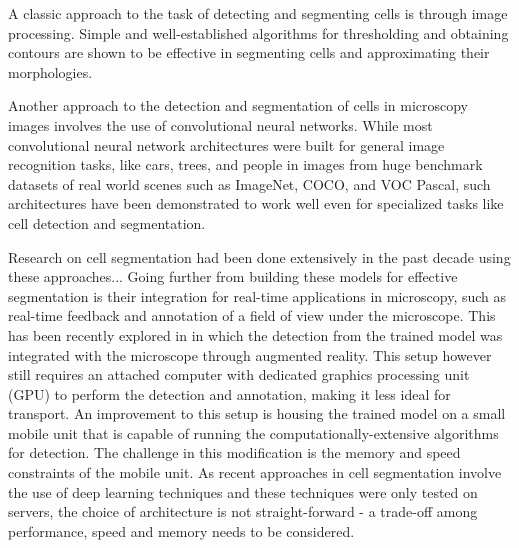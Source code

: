 \documentclass[10pt, journal, compsoc]{IEEEtran}
\begin{document}
A classic approach to the task of detecting and segmenting cells is through image processing. Simple and well-established algorithms for thresholding and obtaining contours are shown to be effective in segmenting cells and approximating their morphologies. 

Another approach to the detection and segmentation of cells in microscopy images involves the use of convolutional neural networks. While most convolutional neural network architectures were built for general image recognition tasks, like cars, trees, and people in images from huge benchmark datasets of real world scenes such as ImageNet, COCO, and VOC Pascal, such architectures have been demonstrated to work well even for specialized tasks like cell detection and segmentation. 

Research on cell segmentation had been done extensively in the past decade using these approaches...
Going further from building these models for effective segmentation is their integration for real-time applications in microscopy, such as real-time feedback and annotation of a field of view under the microscope. This has been recently explored in \cite{Waithe544833} in which the detection from the trained model was integrated with the microscope through augmented reality. This setup however still requires an attached computer with dedicated graphics processing unit (GPU) to perform the detection and annotation, making it less ideal for transport. %
An improvement to this setup is housing the trained model on a small mobile unit that is capable of running the computationally-extensive algorithms for detection. The challenge in this modification is the memory and speed constraints of the mobile unit. As recent approaches in cell segmentation involve the use of deep learning techniques and these techniques were only tested on servers, the choice of architecture is not straight-forward - a trade-off among performance, speed and memory needs to be considered.
\end{document}
